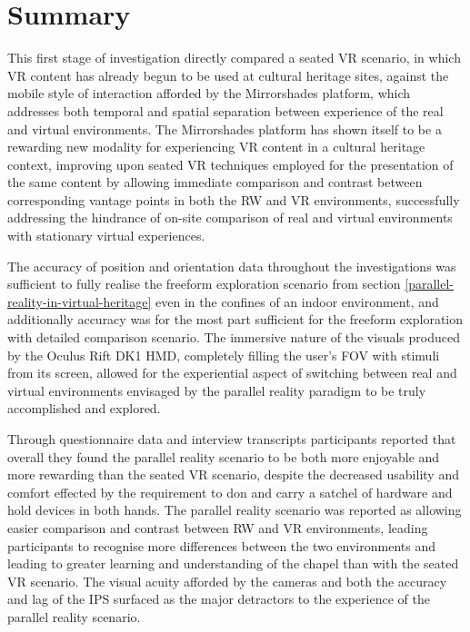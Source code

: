 
\section{Summary}

This first stage of investigation directly compared a seated VR scenario, in which VR content has already begun to be used at cultural heritage sites, against the mobile style of interaction afforded by the Mirrorshades platform, which addresses both temporal and spatial separation between experience of the real and virtual environments. The Mirrorshades platform has shown itself to be a rewarding new modality for experiencing VR content in a cultural heritage context, improving upon seated VR techniques employed for the presentation of the same content by allowing immediate comparison and contrast between corresponding vantage points in both the RW and VR environments, successfully addressing the hindrance of on-site comparison of real and virtual environments with stationary virtual experiences.

The accuracy of position and orientation data throughout the investigations was sufficient to fully realise the freeform exploration scenario from section \ref{parallel-reality-in-virtual-heritage} even in the confines of an indoor environment, and additionally accuracy was for the most part sufficient for the freeform exploration with detailed comparison scenario. The immersive nature of the visuals produced by the Oculus Rift DK1 HMD, completely filling the user's FOV with stimuli from its screen, allowed for the experiential aspect of switching between real and virtual environments envisaged by the parallel reality paradigm to be truly accomplished and explored.

Through questionnaire data and interview transcripts participants reported that overall they found the parallel reality scenario to be both more enjoyable and more rewarding than the seated VR scenario, despite the decreased usability and comfort effected by the requirement to don and carry a satchel of hardware and hold devices in both hands. The parallel reality scenario was reported as allowing easier comparison and contrast between RW and VR environments, leading participants to recognise more differences between the two environments and leading to greater learning and understanding of the chapel than with the seated VR scenario. The visual acuity afforded by the cameras and both the accuracy and lag of the IPS surfaced as the major detractors to the experience of the parallel reality scenario.

